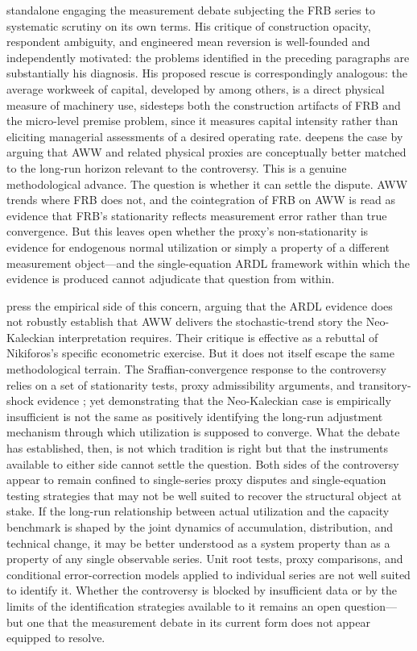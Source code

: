 \documentclass[11pt,a4paper]{article}
\begin{document}
\citet{Nikiforos2016} standalone engaging the  measurement debate  subjecting the FRB series to systematic scrutiny
on its own terms. His critique of construction opacity, respondent ambiguity, and engineered mean reversion is well-founded and independently motivated: the problems identified in the preceding paragraphs are substantially his diagnosis. His proposed rescue is correspondingly analogous: the average workweek of capital, developed by
\citet{Foss1981,Foss1985} among others, is a direct physical measure of machinery use, sidesteps both the construction artifacts of FRB and the micro-level premise problem, since it measures capital intensity rather than eliciting managerial assessments of a desired operating rate. \citet{Nikiforos2021} deepens the case by arguing that AWW and related physical proxies are conceptually better matched to the long-run horizon relevant to the controversy. This is a genuine methodological advance. The question is whether it can settle the dispute. AWW trends where FRB does not, and the cointegration of FRB on AWW is read as evidence that FRB's stationarity reflects measurement error rather than
true convergence. But this leaves open whether the proxy's non-stationarity is evidence for endogenous normal utilization or simply a property of a different measurement object---and the single-equation ARDL framework within which the evidence is produced cannot adjudicate that question from within.

\citet{GahnGonzalez2020} press the empirical side of this concern, arguing that the ARDL evidence does not robustly establish that AWW delivers the stochastic-trend story the Neo-Kaleckian interpretation requires.
Their critique is effective as a rebuttal of Nikiforos's specific econometric exercise. But it does not itself escape the same methodological terrain. The Sraffian-convergence response to the controversy relies on a set of stationarity tests, proxy admissibility arguments, and transitory-shock evidence \citep{GahnGonzalez2022,Deleidi2024}; yet demonstrating that the Neo-Kaleckian case is empirically insufficient is not the same as positively identifying the long-run adjustment mechanism through which utilization is supposed to converge. What the debate has established, then, is not which tradition is right but that the instruments available to either side cannot settle the
question. Both sides of the controversy appear to remain confined to single-series proxy disputes and single-equation testing strategies that may not be well suited to recover the structural object at stake. If the long-run relationship between actual utilization and the capacity benchmark is shaped by the joint dynamics of accumulation, distribution, and technical change, it may be better understood as a system property than as a property of any single observable series. Unit root tests, proxy comparisons, and conditional error-correction models applied to individual series are not well suited to identify it. Whether the controversy is blocked by insufficient data or by the limits of the identification strategies available to it remains an open question---but one that the measurement debate in its current form does not appear equipped to resolve.
\end{document}
